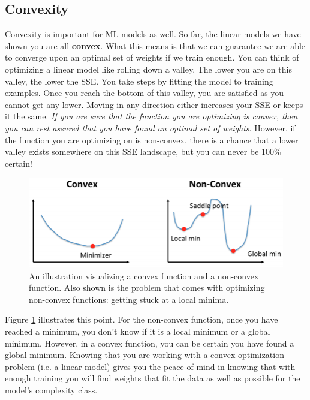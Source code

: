 \subsection{Convexity}
    \large Convexity is important for ML models as well. So far, the linear models we have shown you are all \textbf{convex}. What this means is that we can guarantee we are able to converge upon an optimal set of weights if we train enough. You can think of optimizing a linear model like rolling down a valley. The lower you are on this valley, the lower the SSE. You take steps by fitting the model to training examples. Once you reach the bottom of this valley, you are satisfied as you cannot get any lower. Moving in any direction either increases your SSE or keeps it the same. \textit{If you are sure that the function you are optimizing is convex, then you can rest assured that you have found an optimal set of weights}. However, if the function you are optimizing on is non-convex, there is a chance that a lower valley exists somewhere on this SSE landscape, but you can never be 100\% certain!

    \begin{figure}[H]
        \centering
        \includegraphics[width=0.8\linewidth]{ml/convexity.png}
        \caption{An illustration visualizing a convex function and a non-convex function. Also shown is the problem that comes with optimizing non-convex functions: getting stuck at a local minima.}
        \label{fig:convexity}
    \end{figure}
    
    Figure \ref{fig:convexity} illustrates this point. For the non-convex function, once you have reached a minimum, you don't know if it is a local minimum or a global minimum. However, in a convex function, you can be certain you have found a global minimum. Knowing that you are working with a convex optimization problem (i.e. a linear model) gives you the peace of mind in knowing that with enough training you will find weights that fit the data as well as possible for the model's complexity class.

